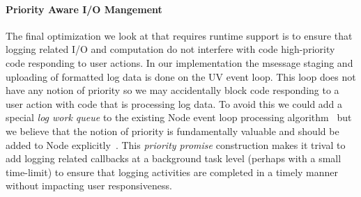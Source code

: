 \paragraph{Priority Aware I/O Mangement}
\noindent
The final optimization we look at that requires runtime support is to ensure 
that logging related I/O and computation do not interfere with code high-priority 
code responding to user actions. In our implementation the msessage staging 
and uploading of formatted log data is done on the UV event loop. This loop does 
not have any notion of priority so we may accidentally block code responding 
to a user action with code that is processing log data. To avoid this we could 
add a special \emph{log work queue} to the existing Node event loop processing 
algorithm~\cite{nodeeventloop} but we believe that the notion of priority is 
fundamentally valuable and should be added to Node explicitly~\cite{asyncnode}. 
This \emph{priority promise} construction makes it trival to add logging related 
callbacks at a background task level (perhaps with a small time-limit) to ensure 
that logging activities are completed in a timely manner without impacting user 
responsiveness.






